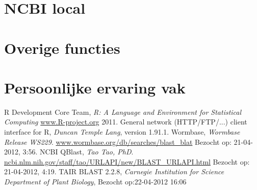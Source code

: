 \documentclass[a4paper]{article}
\begin{document}
\section*{NCBI local}
\section*{Overige functies}
\section*{Persoonlijke ervaring vak}


\renewcommand{\refname}{Referenties}
\begin{thebibliography}{9}
    R Development Core Team, \emph{R: A Language and Environment for Statistical Computing}
    \url{www.R-project.org} 2011.
    General network (HTTP/FTP/...) client interface for R, \emph{Duncan Temple Lang}, version 1.91.1.
    Wormbase, \emph{Wormbase Release WS229}. \url{www.wormbase.org/db/searches/blast_blat} Bezocht op: 21-04-2012, 3:56.
    NCBI QBlast, \emph{Tao Tao, PhD}. \url{ncbi.nlm.nih.gov/staff/tao/URLAPI/new/BLAST_URLAPI.html} Bezocht op: 21-04-2012, 4:19.
    TAIR BLAST 2.2.8, \emph{Carnegie Institution for Science Department of Plant Biology}, Bezocht op:22-04-2012 16:06

\end{thebibliography}
\end{document}
